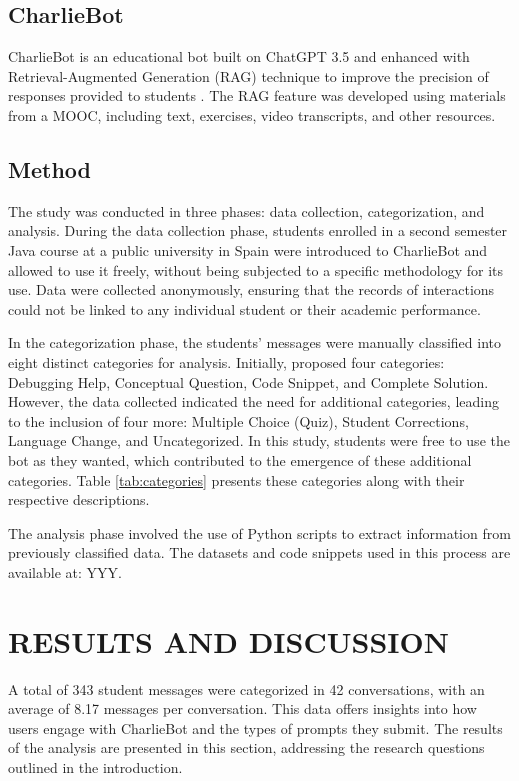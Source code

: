 \documentclass[a4paper,twoside]{article}
\begin{document}
\subsection{CharlieBot}

CharlieBot is an educational bot built on ChatGPT 3.5 and enhanced with
Retrieval-Augmented Generation (RAG) technique to improve the precision of
responses provided to students \cite{Sun24}. The RAG feature was developed using
materials from a MOOC, including text, exercises, video transcripts, and other
resources.

\subsection{Method}

The study was conducted in three phases: data collection,
categorization, and analysis. During the data collection phase, students
enrolled in a second semester Java course at a public university in Spain were
introduced to CharlieBot and allowed to use it freely, without being subjected
to a specific methodology for its use. Data were collected anonymously, ensuring
that the records of interactions could not be linked to any individual student
or their academic performance.

In the categorization phase, the students' messages were manually classified
into eight distinct categories for analysis. Initially, \cite{Ghimire24}
proposed four categories: Debugging Help, Conceptual Question, Code Snippet,
and Complete Solution. However, the data collected indicated the need for
additional categories, leading to the inclusion of four more: Multiple Choice
(Quiz), Student Corrections, Language Change, and Uncategorized. In this study,
students were free to use the bot as they wanted, which contributed to the
emergence of these additional categories. Table \ref{tab:categories} presents
these categories along with their respective descriptions.

The analysis phase involved the use of Python scripts to extract information
from previously classified data. The datasets and code snippets used in this
process are available at: YYY.

\section{\uppercase{Results and Discussion}}

A total of 343 student messages were categorized in 42 conversations, with
an average of 8.17 messages per conversation. This data offers insights into how
users engage with CharlieBot and the types of prompts they submit. The results of
the analysis are presented in this section, addressing the research questions
outlined in the introduction.
\end{document}
